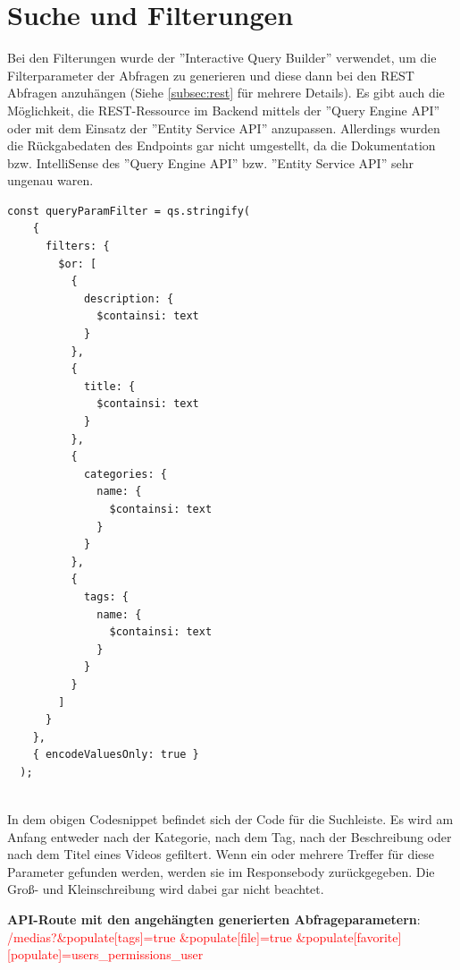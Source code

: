 \section{Suche und Filterungen}

Bei den Filterungen wurde der ''Interactive Query Builder'' verwendet,
um die Filterparameter der Abfragen zu generieren
und diese dann bei den REST Abfragen anzuhängen (Siehe \ref{subsec:rest} für mehrere Details).
Es gibt auch die Möglichkeit, die REST-Ressource im Backend mittels der
''Query Engine API'' oder mit dem Einsatz der ''Entity Service API'' anzupassen.
Allerdings wurden die Rückgabedaten des Endpoints gar nicht umgestellt,
da die Dokumentation bzw. IntelliSense des ''Query Engine API'' bzw. ''Entity Service API'' sehr ungenau waren.


\begin{lstlisting}[caption=Code von Interactive Query Builder]
  const queryParamFilter = qs.stringify(
    {
      filters: {
        $or: [
          {
            description: {
              $containsi: text
            }
          },
          {
            title: {
              $containsi: text
            }
          },
          {
            categories: {
              name: {
                $containsi: text
              }
            }
          },
          {
            tags: {
              name: {
                $containsi: text
              }
            }
          }
        ]
      }
    },
    { encodeValuesOnly: true }
  );
  
\end{lstlisting}
In dem obigen Codesnippet befindet sich der Code für die Suchleiste.
Es wird am Anfang entweder nach der Kategorie, nach dem Tag,
nach der Beschreibung oder nach dem Titel eines Videos gefiltert.
Wenn ein oder mehrere Treffer für diese Parameter gefunden werden,
werden sie im Responsebody zurückgegeben.
Die Groß- und Kleinschreibung wird dabei gar nicht beachtet.


\textbf{API-Route mit den angehängten generierten Abfrageparametern}:
\newline
\textcolor{red}{/medias?\&populate[tags]=true
\&populate[file]=true
\&populate[favorite][populate]=\newline users\_permissions\_user}


